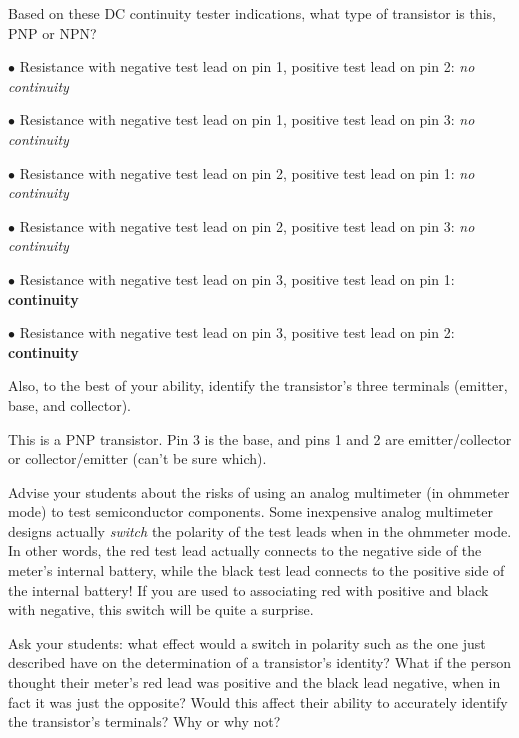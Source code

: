 

Based on these DC continuity tester indications, what type of transistor is this, PNP or NPN?

\medskip
\item{$\bullet$} Resistance with negative test lead on pin 1, positive test lead on pin 2: {\it no continuity}
\item{$\bullet$} Resistance with negative test lead on pin 1, positive test lead on pin 3: {\it no continuity}
\item{$\bullet$} Resistance with negative test lead on pin 2, positive test lead on pin 1: {\it no continuity}
\item{$\bullet$} Resistance with negative test lead on pin 2, positive test lead on pin 3: {\it no continuity}
\item{$\bullet$} Resistance with negative test lead on pin 3, positive test lead on pin 1: {\bf continuity}
\item{$\bullet$} Resistance with negative test lead on pin 3, positive test lead on pin 2: {\bf continuity}
\medskip

Also, to the best of your ability, identify the transistor's three terminals (emitter, base, and collector).







This is a PNP transistor.  Pin 3 is the base, and pins 1 and 2 are emitter/collector or collector/emitter (can't be sure which).







Advise your students about the risks of using an analog multimeter (in ohmmeter mode) to test semiconductor components.  Some inexpensive analog multimeter designs actually {\it switch} the polarity of the test leads when in the ohmmeter mode.  In other words, the red test lead actually connects to the negative side of the meter's internal battery, while the black test lead connects to the positive side of the internal battery!  If you are used to associating red with positive and black with negative, this switch will be quite a surprise.

Ask your students: what effect would a switch in polarity such as the one just described have on the determination of a transistor's identity?  What if the person thought their meter's red lead was positive and the black lead negative, when in fact it was just the opposite?  Would this affect their ability to accurately identify the transistor's terminals?  Why or why not?




